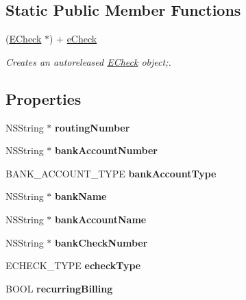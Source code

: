 \subsection*{Static Public Member Functions}
\begin{DoxyCompactItemize}
\item 
(\hyperlink{interface_e_check}{ECheck} $\ast$) + \hyperlink{interface_e_check_a6990be9ab121e4f07a07924bce0a422b}{eCheck}
\begin{DoxyCompactList}\small\item\em Creates an autoreleased \hyperlink{interface_e_check}{ECheck} object;. \item\end{DoxyCompactList}\end{DoxyCompactItemize}
\subsection*{Properties}
\begin{DoxyCompactItemize}
\item 
\hypertarget{interface_e_check_a63fe402c597e16d5072cb7fd847e3ec2}{
NSString $\ast$ {\bfseries routingNumber}}
\label{interface_e_check_a63fe402c597e16d5072cb7fd847e3ec2}

\item 
\hypertarget{interface_e_check_a1cd64d4f7def11d337f78040d7b52494}{
NSString $\ast$ {\bfseries bankAccountNumber}}
\label{interface_e_check_a1cd64d4f7def11d337f78040d7b52494}

\item 
\hypertarget{interface_e_check_a911ad86a40b578c0570705f9e36fc18e}{
BANK\_\-ACCOUNT\_\-TYPE {\bfseries bankAccountType}}
\label{interface_e_check_a911ad86a40b578c0570705f9e36fc18e}

\item 
\hypertarget{interface_e_check_a4dfe57223b8b1fa1319f75a04a966002}{
NSString $\ast$ {\bfseries bankName}}
\label{interface_e_check_a4dfe57223b8b1fa1319f75a04a966002}

\item 
\hypertarget{interface_e_check_a22f0c0734ba51e83e5b7d036023ec2eb}{
NSString $\ast$ {\bfseries bankAccountName}}
\label{interface_e_check_a22f0c0734ba51e83e5b7d036023ec2eb}

\item 
\hypertarget{interface_e_check_a10821ed4b5ee9033a558dfabb27126e9}{
NSString $\ast$ {\bfseries bankCheckNumber}}
\label{interface_e_check_a10821ed4b5ee9033a558dfabb27126e9}

\item 
\hypertarget{interface_e_check_ad304786202227025c5c6ddb2a8d6446e}{
ECHECK\_\-TYPE {\bfseries echeckType}}
\label{interface_e_check_ad304786202227025c5c6ddb2a8d6446e}

\item 
\hypertarget{interface_e_check_a4b2b9ac8cb27ff6692bafb4d5aa92cba}{
BOOL {\bfseries recurringBilling}}
\label{interface_e_check_a4b2b9ac8cb27ff6692bafb4d5aa92cba}

\end{DoxyCompactItemize}


